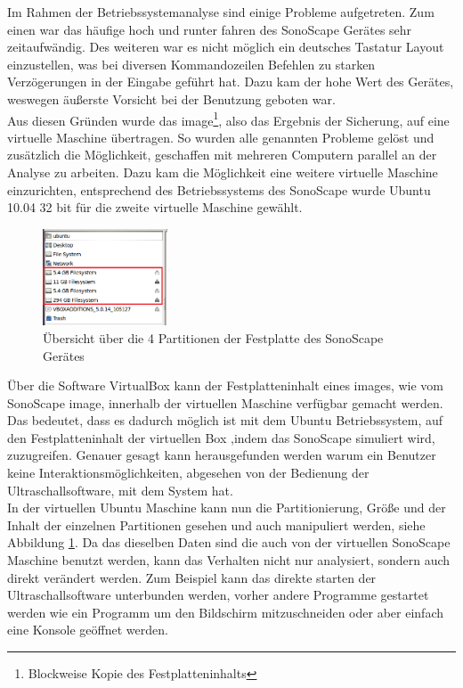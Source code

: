 Im Rahmen der Betriebssystemanalyse sind einige Probleme aufgetreten. Zum einen war das häufige hoch und runter fahren des SonoScape Gerätes sehr zeitaufwändig. Des weiteren war es nicht möglich ein deutsches Tastatur Layout einzustellen, was bei diversen Kommandozeilen Befehlen zu starken Verzögerungen in der Eingabe geführt hat. Dazu kam der hohe Wert des Gerätes, weswegen äußerste Vorsicht bei der Benutzung geboten war.\\
Aus diesen Gründen wurde das image\footnote{Blockweise Kopie des Festplatteninhalts}, also das Ergebnis der Sicherung, auf eine virtuelle Maschine übertragen. So wurden alle genannten Probleme gelöst und zusätzlich die Möglichkeit, geschaffen mit mehreren Computern parallel an der Analyse zu arbeiten. Dazu kam die Möglichkeit eine weitere virtuelle Maschine einzurichten, entsprechend des Betriebssystems des SonoScape wurde Ubuntu 10.04 32 bit für die zweite virtuelle Maschine gewählt.\\
\begin{figure}
\vspace{-19pt}
\centering
\includegraphics*[width =0.33\textwidth]{Sonoscape_Analyse/Anzahl_Festplatten}
\caption{{\small Übersicht über die 4 Partitionen der Festplatte des SonoScape Gerätes}}
\label{fig:Festplatte}
\end{figure}
Über die Software VirtualBox kann der Festplatteninhalt eines images, wie vom SonoScape image, innerhalb der virtuellen Maschine verfügbar gemacht werden. Das bedeutet, dass es dadurch möglich ist mit dem Ubuntu Betriebssystem, auf den Festplatteninhalt der virtuellen Box ,indem das SonoScape simuliert wird, zuzugreifen. Genauer gesagt kann herausgefunden werden warum ein Benutzer keine Interaktionsmöglichkeiten, abgesehen von der Bedienung der Ultraschallsoftware, mit dem System hat.\\
In der virtuellen Ubuntu Maschine kann nun die Partitionierung, Größe und der Inhalt der einzelnen Partitionen gesehen und auch manipuliert werden, siehe Abbildung \ref{fig:Festplatte}. Da das dieselben Daten sind die auch von der virtuellen SonoScape Maschine benutzt werden, kann das Verhalten nicht nur analysiert, sondern auch direkt verändert werden.
Zum Beispiel kann das direkte starten der Ultraschallsoftware unterbunden werden, vorher andere Programme gestartet werden wie ein Programm um den Bildschirm mitzuschneiden oder aber einfach eine Konsole geöffnet werden.
